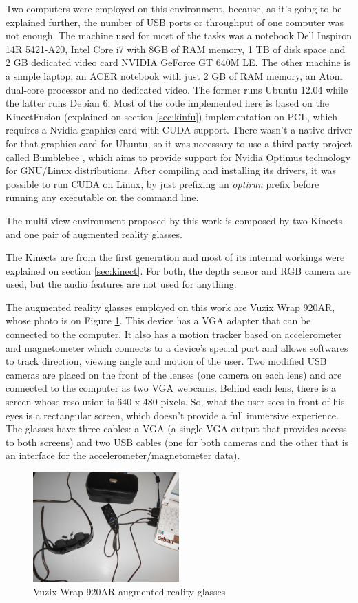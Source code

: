 \documentclass[msc, a4paper, classic, en]{ufbathesis}
\begin{document}
Two computers were employed on this environment, because, as it's going to be explained further, the number of USB ports or throughput of one computer was not enough. The machine used for most of the tasks was a notebook Dell Inspiron 14R 5421-A20, Intel Core i7 with 8GB of RAM memory, 1 TB of disk space and 2 GB dedicated video card NVIDIA GeForce GT 640M LE. The other machine is a simple laptop, an ACER notebook with just 2 GB of RAM memory, an Atom dual-core processor and no dedicated video. The former runs Ubuntu 12.04 while the latter runs Debian 6. Most of the code implemented here is based on the KinectFusion (explained on section \ref{sec:kinfu}) implementation on PCL, which requires a Nvidia graphics card with CUDA support. There wasn't a native driver for that graphics card for Ubuntu, so it was necessary to use a third-party project called Bumblebee \cite{bumblebee}, which aims to provide support for Nvidia Optimus technology for GNU/Linux distributions. After compiling and installing its drivers, it was possible to run CUDA on Linux, by just prefixing an \textit{optirun} prefix before running any executable on the command line.

The multi-view environment proposed by this work is composed by two Kinects and one pair of augmented reality glasses.

The Kinects are from the first generation and most of its internal workings were explained on section \ref{sec:kinect}. For both, the depth sensor and RGB camera are used, but the audio features are not used for anything.

The augmented reality glasses employed on this work are Vuzix Wrap 920AR, whose photo is on Figure \ref{fig:glasses}. This device has a VGA adapter that can be connected to the computer. It also has a motion tracker based on accelerometer and magnetometer which connects to a device's special port and allows softwares to track direction, viewing angle and motion of the user. Two modified USB cameras are placed on the front of the lenses (one camera on each lens) and are connected to the computer as two VGA webcams. Behind each lens, there is a screen whose resolution is 640 x 480 pixels. So, what the user sees in front of his eyes is a rectangular screen, which doesn't provide a full immersive experience. The glasses have three cables: a VGA (a single VGA output that provides access to both screens) and two USB cables (one for both cameras and the other that is an interface for the accelerometer/magnetometer data).

\begin{figure}
\centering
\includegraphics[width=0.5\textwidth]{images/vuzix.png}
\caption{Vuzix Wrap 920AR augmented reality glasses}
\label{fig:glasses}
\end{figure}
\end{document}
